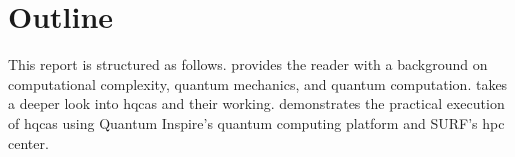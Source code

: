 \section{Outline}
This report is structured as follows.
 provides the reader with a background on computational complexity, quantum mechanics, and quantum computation.
 takes a deeper look into \glspl{hqca} and their working.
 demonstrates the practical execution of \glspl{hqca} using Quantum Inspire's quantum computing platform and SURF's \gls{hpc} center.
